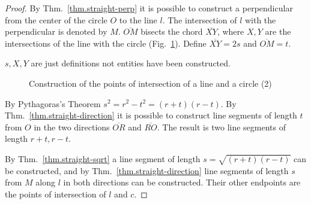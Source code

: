 \begin{proof}
By Thm.~\ref{thm.straight-perp} it is possible to construct a perpendicular from the center of the circle $O$ to the line $l$. The intersection of $l$ with the perpendicular is denoted by $M$. $\overline{OM}$ bisects the chord $\overline{XY}$, where $X, Y$ are the intersections of the line with the circle (Fig.~\ref{f.se-line-circle2}). Define $\overline{XY}=2s$ and $\overline{OM}=t$.

$s,X,Y$ are just definitions not entities  have been constructed.
\begin{figure}[ht]
\begin{center}
\end{center}
\caption{Construction of the points of intersection of a line and a circle (2)}\label{f.se-line-circle2}
\end{figure}

By Pythagoras's Theorem $s^2=r^2-t^2=(r+t)(r-t)$. By Thm.~\ref{thm.straight-direction} it is possible to construct line segments of length $t$ from $O$ in the two directions $\overline{OR}$ and $\overline{RO}$. The result is two line segments of length $r+t,r-t$.

By Thm.~\ref{thm.straight-sqrt} a line segment of length $s=\sqrt{(r+t)(r-t)}$ can be constructed, and by Thm.~\ref{thm.straight-direction} line segments of length $s$ from $M$ along $l$ in both directions can be constructed. Their other endpoints are the points of intersection of $l$ and $c$.
\end{proof}

